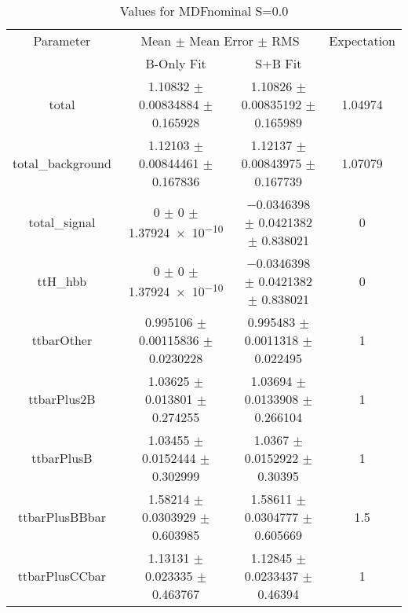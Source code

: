 \begin{table}
\centering
\caption{Values for MDFnominal S=0.0}
\begin{tabular}{cccc}
\toprule
Parameter & \multicolumn{2}{c}{Mean $\pm$ Mean Error $\pm$ RMS} & Expectation\\
 & B-Only Fit & S+B Fit & \\
\midrule
total & \num{1.10832} $\pm$ \num{0.00834884} $\pm$ \num{0.165928} & \num{1.10826} $\pm$ \num{0.00835192} $\pm$ \num{0.165989} & \num{1.04974}\\
total\_background & \num{1.12103} $\pm$ \num{0.00844461} $\pm$ \num{0.167836} & \num{1.12137} $\pm$ \num{0.00843975} $\pm$ \num{0.167739} & \num{1.07079}\\
total\_signal & \num{0} $\pm$ \num{0} $\pm$ \num{1.37924e-10} & \num{-0.0346398} $\pm$ \num{0.0421382} $\pm$ \num{0.838021} & \num{0}\\
ttH\_hbb & \num{0} $\pm$ \num{0} $\pm$ \num{1.37924e-10} & \num{-0.0346398} $\pm$ \num{0.0421382} $\pm$ \num{0.838021} & \num{0}\\
ttbarOther & \num{0.995106} $\pm$ \num{0.00115836} $\pm$ \num{0.0230228} & \num{0.995483} $\pm$ \num{0.0011318} $\pm$ \num{0.022495} & \num{1}\\
ttbarPlus2B & \num{1.03625} $\pm$ \num{0.013801} $\pm$ \num{0.274255} & \num{1.03694} $\pm$ \num{0.0133908} $\pm$ \num{0.266104} & \num{1}\\
ttbarPlusB & \num{1.03455} $\pm$ \num{0.0152444} $\pm$ \num{0.302999} & \num{1.0367} $\pm$ \num{0.0152922} $\pm$ \num{0.30395} & \num{1}\\
ttbarPlusBBbar & \num{1.58214} $\pm$ \num{0.0303929} $\pm$ \num{0.603985} & \num{1.58611} $\pm$ \num{0.0304777} $\pm$ \num{0.605669} & \num{1.5}\\
ttbarPlusCCbar & \num{1.13131} $\pm$ \num{0.023335} $\pm$ \num{0.463767} & \num{1.12845} $\pm$ \num{0.0233437} $\pm$ \num{0.46394} & \num{1}\\
\bottomrule
\end{tabular}
\end{table}
